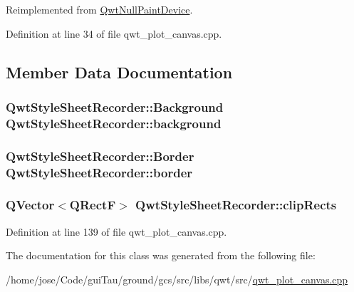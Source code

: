 Reimplemented from \hyperlink{class_qwt_null_paint_device_a235bd4e1453a13f7c4c076a9595a8840}{Qwt\-Null\-Paint\-Device}.



Definition at line 34 of file qwt\-\_\-plot\-\_\-canvas.\-cpp.



\subsection{Member Data Documentation}
\hypertarget{class_qwt_style_sheet_recorder_afc46f692310f3c7339978abd184838e8}{
\subsubsection[{background}]{ {\bf Qwt\-Style\-Sheet\-Recorder\-::\-Background}  Qwt\-Style\-Sheet\-Recorder\-::background}}\label{class_qwt_style_sheet_recorder_afc46f692310f3c7339978abd184838e8}
\hypertarget{class_qwt_style_sheet_recorder_a82b25ff7104bbdb9fb8034a38f8f0a12}{
\subsubsection[{border}]{ {\bf Qwt\-Style\-Sheet\-Recorder\-::\-Border}  Qwt\-Style\-Sheet\-Recorder\-::border}}\label{class_qwt_style_sheet_recorder_a82b25ff7104bbdb9fb8034a38f8f0a12}
\hypertarget{class_qwt_style_sheet_recorder_ac2133bd0e7a9c799473f4cb6fbf523aa}{
\subsubsection[{clip\-Rects}]{\setlength{\rightskip}{0pt plus 5cm}Q\-Vector$<$Q\-Rect\-F$>$ Qwt\-Style\-Sheet\-Recorder\-::clip\-Rects}}\label{class_qwt_style_sheet_recorder_ac2133bd0e7a9c799473f4cb6fbf523aa}


Definition at line 139 of file qwt\-\_\-plot\-\_\-canvas.\-cpp.



The documentation for this class was generated from the following file\-:\begin{DoxyCompactItemize}
\item 
/home/jose/\-Code/gui\-Tau/ground/gcs/src/libs/qwt/src/\hyperlink{qwt__plot__canvas_8cpp}{qwt\-\_\-plot\-\_\-canvas.\-cpp}\end{DoxyCompactItemize}
